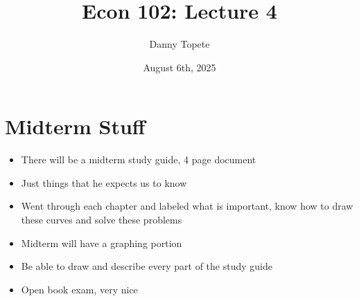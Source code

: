 \documentclass{article}
\title{Econ 102: Lecture 4}
\author{Danny Topete}
\date{August 6th, 2025}
\begin{document}
\maketitle

\section{Midterm Stuff}
\begin{itemize}
  \item There will be a midterm study guide, 4 page document
  \item Just things that he expects us to know
  \item Went through each chapter and labeled
    what is important, know how to draw these curves and solve these problems
  \item Midterm will have a graphing portion
  \item Be able to draw and describe every part of the study guide
  \item Open book exam, very nice
\end{itemize}
\end{document}
